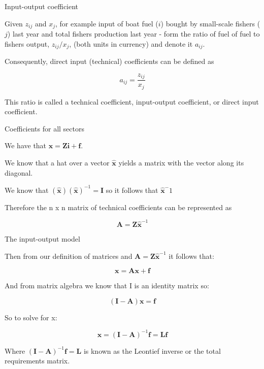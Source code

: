 \documentclass[ignorenonframetext,]{beamer}
\begin{document}
\begin{frame}{Input-output coefficient}

Given \(z_{ij}\) and \(x_j\), for example input of boat fuel (\(i\))
bought by small-scale fishers (\(j\)) last year and total fishers
production last year - form the ratio of fuel of fuel to fishers output,
\(z_{ij}/x_{j}\), (both units in currency) and denote it \(a_{ij}\).

Consequently, direct input (technical) coefficients can be defined as

\[a_{ij} = \frac{z_{ij}}{x_j}\]

This ratio is called a technical coefficient, input-output coefficient,
or direct input coefficient.

\end{frame}

\begin{frame}{Coefficients for all sectors}

We have that \(\mathbf{x} = \mathbf{Zi} + \mathbf{f}\).

We know that a hat over a vector \(\mathbf{\hat{x}}\) yields a matrix
with the vector along its diagonal.

We know that \((\mathbf{\hat{x}})(\mathbf{\hat{x}})^{-1} = \mathbf{I}\)
so it follows that \(\mathbf{\hat{x}}^-1\)

Therefore the n x n matrix of technical coefficients can be represented
as

\[\mathbf{A} = \mathbf{Z}\mathbf{\hat{x}}^{-1}\]

\end{frame}

\begin{frame}{The input-output model}

Then from our definition of matrices and
\(\mathbf{A} = \mathbf{Z}\mathbf{\hat{x}}^{-1}\) it follows that:

\[\mathbf{x}=\mathbf{Ax} + \mathbf{f}\]

And from matrix algebra we know that I is an identity matrix so:

\[(\mathbf{I} - \mathbf{A})\mathbf{x} = \mathbf{f}\]

So to solve for x:

\[\mathbf{x}=(\mathbf{I}-\mathbf{A})^{-1} \mathbf{f} = \mathbf{L}\mathbf{f}\]

Where \((\mathbf{I}-\mathbf{A})^{-1} \mathbf{f} = \mathbf{L}\) is known
as the Leontief inverse or the total requirements matrix.

\end{frame}
\end{document}
